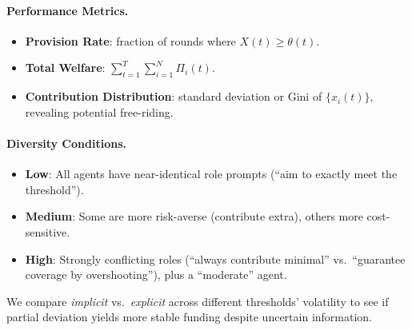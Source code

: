 \paragraph{Performance Metrics.}
\begin{itemize}
    \item \textbf{Provision Rate}: fraction of rounds where $X(t)\ge\theta(t)$.
    \item \textbf{Total Welfare}: $\sum_{t=1}^T \sum_{i=1}^N \Pi_i(t)$.
    \item \textbf{Contribution Distribution}: standard deviation or Gini of $\{x_i(t)\}$, revealing potential free-riding.
\end{itemize}

\paragraph{Diversity Conditions.}
\begin{itemize}
    \item \textbf{Low}: All agents have near-identical role prompts (``aim to exactly meet the threshold''). 
    \item \textbf{Medium}: Some are more risk-averse (contribute extra), others more cost-sensitive. 
    \item \textbf{High}: Strongly conflicting roles (``always contribute minimal'' vs.\ ``guarantee coverage by overshooting''), plus a “moderate” agent.
\end{itemize}
We compare \emph{implicit} vs.\ \emph{explicit} across different thresholds' volatility to see if partial deviation yields more stable funding despite uncertain information.

